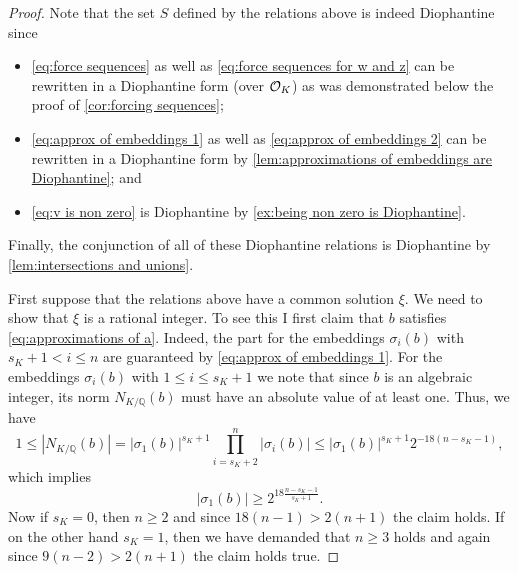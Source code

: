 \begin{proof}
  Note that the set \(S\) defined by the relations above is indeed Diophantine
  since
  \begin{itemize}
    \item \eqref{eq:force sequences} as well as \eqref{eq:force sequences for w
    and z} can be rewritten in a Diophantine form (over \(\mathcal{O}_{K}\)) as was
    demonstrated below the proof of \cref{cor:forcing sequences};

    \item \eqref{eq:approx of embeddings 1} as well as \eqref{eq:approx of
    embeddings 2} can be rewritten in a Diophantine form by
    \cref{lem:approximations of embeddings are Diophantine}; and

    \item \eqref{eq:v is non zero} is Diophantine by \cref{ex:being non zero is
    Diophantine}.
  \end{itemize}
  Finally, the conjunction of all of these Diophantine relations is Diophantine
  by \cref{lem:intersections and unions}.

  First suppose that the relations above have a common solution \(ξ\). We need
  to show that \(ξ\) is a rational integer. To see this I first claim that \(b\)
  satisfies \eqref{eq:approximations of a}. Indeed, the part for the embeddings
  \(σ_i(b)\) with \(s_K + 1 < i ≤ n\) are guaranteed by \eqref{eq:approx of
  embeddings 1}. For the embeddings \(σ_i(b)\) with \(1 ≤ i ≤ s_K + 1\) we note
  that since \(b\) is an algebraic integer, its norm \(N_{K/ℚ}(b)\) must have an
  absolute value of at least one. Thus, we have
  \[
    1 ≤ |N_{K/ℚ}(b)| = |σ_1(b)|^{s_K + 1} \prod_{i = s_K + 2}^n |σ_i(b)| ≤
      |σ_1(b)|^{s_K + 1} 2^{-18 (n - s_K - 1)},
  \]
  which implies
  \[
    |σ_1(b)| ≥ 2^{18 \frac{n - s_K - 1}{s_K + 1}}.
  \]
  Now if \(s_K = 0\), then \(n ≥ 2\) and since \(18 (n - 1) > 2 (n + 1)\) the
  claim holds. If on the other hand \(s_K = 1\), then we have demanded that \(n
  ≥ 3\) holds and again since \(9 (n - 2) > 2(n + 1)\) the claim holds true.


\end{proof}
